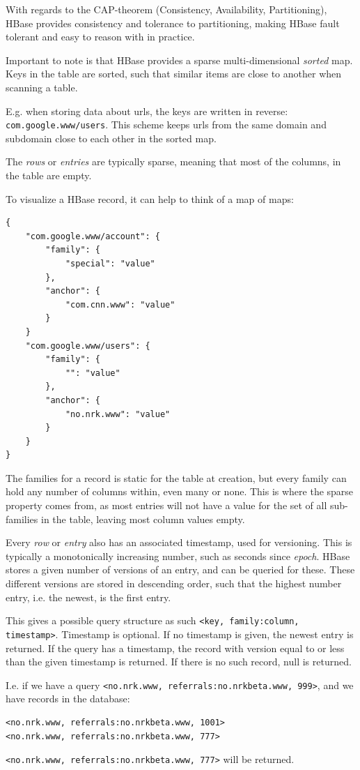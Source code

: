 With regards to the CAP-theorem (Consistency, Availability, Partitioning), HBase provides consistency and tolerance to partitioning, making HBase fault tolerant and easy to reason with in practice.

Important to note is that HBase provides a sparse multi-dimensional \emph{sorted} map.
Keys in the table are sorted, such that similar items are close to another when scanning a table.

E.g. when storing data about urls, the keys are written in reverse: \texttt{com.google.www/users}. This scheme keeps urls from the same domain and subdomain close to each other in the sorted map.

The \emph{rows} or \emph{entries} are typically sparse, meaning that most of the columns, in the table are empty.

To visualize a HBase record, it can help to think of a map of maps:

\begin{lstlisting}[style=customc, caption=A JSON approach to visualize how rows in HBase are structured. Idea courtesy of Jim R. Wilson\cite{jimbojw}.]
{
	"com.google.www/account": {
		"family": {
			"special": "value"
		},
		"anchor": {
			"com.cnn.www": "value"
		}
	}
	"com.google.www/users": {
		"family": {
			"": "value"
		},
		"anchor": {
			"no.nrk.www": "value"
		}
	}
}
\end{lstlisting}

The families for a record is static for the table at creation, but every family can hold any number of columns within, even many or none.
This is where the sparse property comes from, as most entries will not have a value for the set of all sub-families in the table, leaving most column values empty.

Every \emph{row} or \emph{entry} also has an associated timestamp, used for versioning. This is typically a monotonically increasing number, such as seconds since \emph{epoch}. HBase stores a given number of versions of an entry, and can be queried for these. 
These different versions are stored in descending order, such that the highest number entry, i.e. the newest, is the first entry.

This gives a possible query structure as such \texttt{<key, family:column, timestamp>}. Timestamp is optional. If no timestamp is given, the newest entry is returned. 
If the query has a timestamp, the record with version equal to or less than the given timestamp is returned. If there is no such record, null is returned.

I.e. if we have a query \texttt{<no.nrk.www, referrals:no.nrkbeta.www, 999>}, and we have records in the database:
\begin{lstlisting}
<no.nrk.www, referrals:no.nrkbeta.www, 1001>
<no.nrk.www, referrals:no.nrkbeta.www, 777>
\end{lstlisting}
\texttt{<no.nrk.www, referrals:no.nrkbeta.www, 777>} will be returned.

